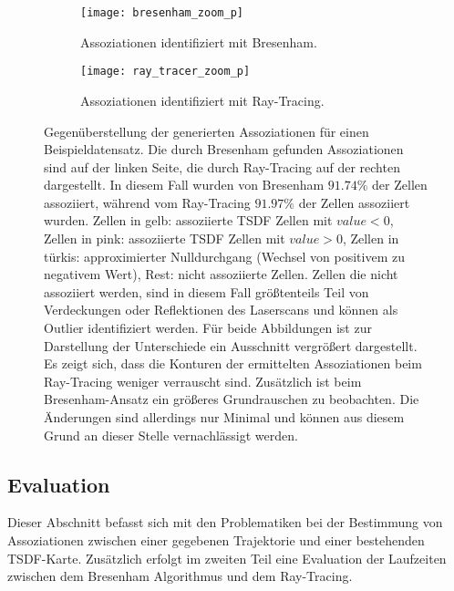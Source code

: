 \begin{figure}
	\centering
	\begin{subfigure}{.5\textwidth}
 		 \centering
  		 \texttt{[image: bresenham\_zoom\_p]}
  		 \centering \caption{Assoziationen identifiziert mit Bresenham.}
  		 \label{fig:sp_bresenham}
	\end{subfigure}%
	\begin{subfigure}{.5\textwidth}
    	\centering
  		\texttt{[image: ray\_tracer\_zoom\_p]}
  		\centering \caption{Assoziationen identifiziert mit Ray-Tracing.}
  		\label{fig:sp_raytrace}
	\end{subfigure}
	\caption{Gegenüberstellung der generierten Assoziationen für einen Beispieldatensatz. Die durch Bresenham gefunden Assoziationen sind auf der linken Seite, die durch Ray-Tracing auf der rechten dargestellt. In diesem Fall wurden von Bresenham $91.74\%$ der Zellen assoziiert, während vom Ray-Tracing $91.97\%$ der Zellen assoziiert wurden. Zellen in gelb: assoziierte TSDF Zellen mit $value < 0$, Zellen in pink: assoziierte TSDF Zellen mit $value > 0$, Zellen in türkis: approximierter Nulldurchgang (Wechsel von positivem zu negativem Wert), Rest: nicht assoziierte Zellen. Zellen die nicht assoziiert werden, sind in diesem Fall größtenteils Teil von Verdeckungen oder Reflektionen des Laserscans und können als Outlier identifiziert werden. Für beide Abbildungen ist zur Darstellung der Unterschiede ein Ausschnitt vergrößert dargestellt. Es zeigt sich, dass die Konturen der ermittelten Assoziationen beim Ray-Tracing weniger verrauscht sind. Zusätzlich ist beim Bresenham-Ansatz ein größeres Grundrauschen zu beobachten. Die Änderungen sind allerdings nur Minimal und können aus diesem Grund an dieser Stelle vernachlässigt werden.}
	\label{fig:bresenham_vs_raytrace}
\end{figure}

\subsection{Evaluation}
\label{section:association_evaluation}

Dieser Abschnitt befasst sich mit den Problematiken bei der Bestimmung von Assoziationen zwischen einer gegebenen Trajektorie und einer bestehenden TSDF-Karte. Zusätzlich erfolgt im zweiten Teil eine Evaluation der Laufzeiten zwischen dem Bresenham Algorithmus und dem Ray-Tracing. 

